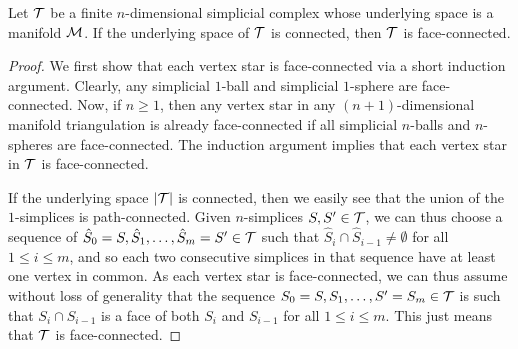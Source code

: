 \documentclass[10pt,letterpaper]{article}
\begin{document}
\begin{lemma}\label{lemma:connectivity}
    Let ${\mathcal T}$ be a finite $n$-dimensional simplicial complex whose underlying space is a manifold ${\mathcal M}$.
    If the underlying space of ${\mathcal T}$ is connected, then ${\mathcal T}$ is face-connected.
\end{lemma}
\begin{proof}
    We first show that each vertex star is face-connected via a short induction argument.
    Clearly, any simplicial $1$-ball and simplicial $1$-sphere are face-connected. 
    Now, if $n \geq 1$, then any vertex star in any $(n+1)$-dimensional manifold triangulation is already face-connected if all simplicial $n$-balls and $n$-spheres are face-connected.
    The induction argument implies that each vertex star in ${\mathcal T}$ is face-connected.

    If the underlying space $\left| {\mathcal T} \right|$ is connected, 
    then we easily see that the union of the $1$-simplices is path-connected.
    Given $n$-simplices $S,S' \in {\mathcal T}$, 
    we can thus choose a sequence of $\hat S_0=S,\hat S_1,\dots,\hat S_m=S' \in {\mathcal T}$ such that $\hat S_{i} \cap \hat S_{i-1} \neq \emptyset$ for all $1 \leq i \leq m$, and so each two consecutive simplices in that sequence have at least one vertex in common. 
    As each vertex star is face-connected, 
    we can thus assume without loss of generality that the sequence $S_0=S,S_1,\dots,S'=S_m \in {\mathcal T}$ 
    is such that $S_{i} \cap S_{i-1}$ is a face of both $S_{i}$ and $S_{i-1}$ for all $1 \leq i \leq m$.
    This just means that ${\mathcal T}$ is face-connected. 
\end{proof}
\end{document}
